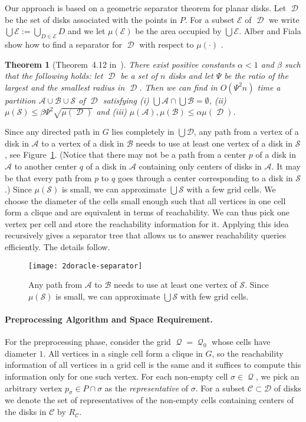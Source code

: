 \documentclass[11pt,a4paper]{paper}
\newtheorem{theorem}{Theorem}[section]
\newcommand\A{{\mathcal A}}
\newcommand\B{{\mathcal B}}
\newcommand\C{{\mathcal C}}
\newcommand\D{{\mathcal D}}
\newcommand\E{{\mathcal E}}
\renewcommand\S{{\mathcal S}}
\DeclareMathOperator{\CD}{\mathcal{D}}
\DeclareMathOperator{\Q}{\mathcal{Q}}
\begin{document}
Our approach is based on a geometric separator theorem for
planar disks.
Let $\CD$ be the set of disks associated with the points in $P$.
For a subset $\E$ of $\CD$ we write
$\bigcup \E := \bigcup_{D \in \E}D$ and we let
$\mu(\E)$ be the area occupied by $\bigcup \E$.
Alber and Fiala show how to find a separator for $\CD$
with respect to $\mu(\cdot)$ \cite{AlberFiala04}.

\begin{theorem}[Theorem~4.12 in~\cite{AlberFiala04}]
\label{thm:diskseparator}
There exist positive constants $\alpha < 1$ and $\beta$ such
that the following holds:
let $\CD$ be a set of $n$ disks and let  $\Psi$ be the ratio of the largest
and the smallest radius in $\CD$.
Then we can find in  $O(\Psi^2n)$ time
a partition $\A \cup \B \cup \S$ of $\CD$ satisfying
(i) $\bigcup \A \cap \bigcup \B = \emptyset$,
(ii) $\mu(\S) \leq \beta\Psi^2 \sqrt{\mu(\CD)}$ and
(iii) $\mu(\A),\mu(\B) \leq \alpha \mu(\CD)$.
\end{theorem}
Since any directed path in $G$ lies completely in $\bigcup \D$, any path from
a vertex of a disk in $\A$ to a vertex of a disk in $\B$ needs to use at least one vertex of a disk in $\S$, see
Figure~\ref{fig:separator}.
(Notice that there may not be a path from a center $p$ of a disk in $\A$ to another center $q$ of a disk in  $\A$ containing only centers of disks in $\A$. It may be that every path from $p$ to $q$ goes through a center corresponding to a disk in $\S$.)
 Since $\mu(\S)$ is small, we can approximate $\bigcup \S$
with a few grid cells. We choose the diameter of the cells small enough such that
all vertices in one cell form a clique and are equivalent in terms of reachability.
We can thus pick one vertex per cell and store the
reachability information for it. Applying this idea
recursively gives a separator tree
that allows us to answer reachability queries efficiently. The details follow.

\begin{figure}[htb]
\centering
\texttt{[image: 2doracle-separator]}
\caption{Any path from $\A$ to $\B$ needs to use at least
one vertex of $\S$. Since $\mu(\S)$ is small, we can approximate $\bigcup \S$ with
few grid cells.}
\label{fig:separator}
\end{figure}

\paragraph*{Preprocessing Algorithm and Space Requirement.}
For the preprocessing phase, consider the grid $\Q = \Q_0$ whose
cells have diameter $1$.
All vertices in a single cell form a  clique in $G$, so the reachability information of all vertices in a grid cell is the same and it
suffices to compute this information only
for one such vertex. For each non-empty cell
$\sigma \in \Q$, we pick an arbitrary vertex $p_\sigma \in P \cap \sigma$
as the \textit{representative} of $\sigma$.
For a subset $\C\subset \D$ of disks we denote the
 set of  representatives of the non-empty cells containing centers of the disks in $\C$ by $R_\C$.
\end{document}

